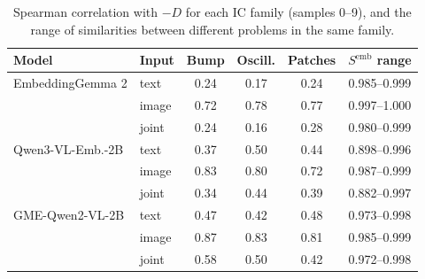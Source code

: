 \begin{table}[h]
\centering
\caption{Spearman correlation with $-D$ for each IC family (samples 0--9), and the range of similarities between different problems in the same family.}
\label{tab:perfamily}
\small
\begin{tabular}{llcccc}
\toprule
Model & Input & Bump & Oscill. & Patches & $S^{\mathrm{emb}}$ range \\
\midrule
EmbeddingGemma 2 & text & 0.24 & 0.17 & 0.24 & 0.985--0.999 \\
 & image & 0.72 & 0.78 & 0.77 & 0.997--1.000 \\
 & joint & 0.24 & 0.16 & 0.28 & 0.980--0.999 \\
Qwen3-VL-Emb.-2B & text & 0.37 & 0.50 & 0.44 & 0.898--0.996 \\
 & image & 0.83 & 0.80 & 0.72 & 0.987--0.999 \\
 & joint & 0.34 & 0.44 & 0.39 & 0.882--0.997 \\
GME-Qwen2-VL-2B & text & 0.47 & 0.42 & 0.48 & 0.973--0.998 \\
 & image & 0.87 & 0.83 & 0.81 & 0.985--0.999 \\
 & joint & 0.58 & 0.50 & 0.42 & 0.972--0.998 \\
\bottomrule
\end{tabular}
\end{table}
